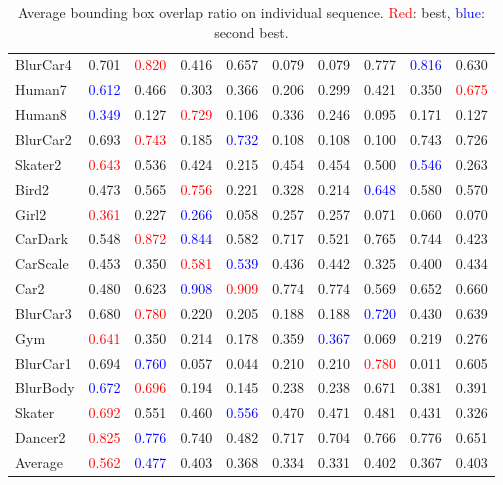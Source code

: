 \documentclass[10pt,twocolumn,letterpaper]{article}
\begin{document}
\begin{table*}
\begin{center}
\begin{tabular}{|p{1.7cm}|K{1.1cm}|K{1.1cm}|K{1.1cm}|K{1.1cm}|K{1.1cm}|K{1.1cm}|K{1.1cm}|K{1.1cm}|K{1.1cm}|}
BlurCar4 & 0.701 & \textcolor{red}{0.820}   & 0.416 & 0.657 & 0.079 & 0.079 & 0.777 & \textcolor{blue}{0.816} & 0.630  \\
Human7   & \textcolor{blue}{0.612} & 0.466  & 0.303 & 0.366 & 0.206 & 0.299 & 0.421 & 0.350  & \textcolor{red}{0.675} \\
Human8   & \textcolor{blue}{0.349} & 0.127  & \textcolor{red}{0.729} & 0.106 & 0.336 & 0.246 & 0.095 & 0.171 & 0.127 \\
BlurCar2 & 0.693 & \textcolor{red}{0.743}  & 0.185 & \textcolor{blue}{0.732} & 0.108 & 0.108 & 0.100   & 0.743 & 0.726 \\
Skater2  & \textcolor{red}{0.643} & 0.536  & 0.424 & 0.215 & 0.454 & 0.454 & 0.500   & \textcolor{blue}{0.546} & 0.263 \\
Bird2    & 0.473 & 0.565  & \textcolor{red}{0.756} & 0.221 & 0.328 & 0.214 & \textcolor{blue}{0.648} & 0.580  & 0.570  \\
Girl2    & \textcolor{red}{0.361} & 0.227  & \textcolor{blue}{0.266} & 0.058 & 0.257 & 0.257 & 0.071 & 0.060  & 0.070  \\
CarDark  & 0.548 & \textcolor{red}{0.872}  & \textcolor{blue}{0.844} & 0.582 & 0.717 & 0.521 & 0.765 & 0.744 & 0.423 \\
CarScale & 0.453 & 0.350   & \textcolor{red}{0.581} & \textcolor{blue}{0.539} & 0.436 & 0.442 & 0.325 & 0.400   & 0.434 \\
Car2     & 0.480  & 0.623  & \textcolor{blue}{0.908} & \textcolor{red}{0.909} & 0.774 & 0.774 & 0.569 & 0.652 & 0.660  \\
BlurCar3 & 0.680  & \textcolor{red}{0.780}   & 0.220  & 0.205 & 0.188 & 0.188 & \textcolor{blue}{0.720}  & 0.430  & 0.639 \\
Gym      & \textcolor{red}{0.641} & 0.350   & 0.214 & 0.178 & 0.359 & \textcolor{blue}{0.367} & 0.069 & 0.219 & 0.276 \\
BlurCar1 & 0.694 & \textcolor{blue}{0.760}   & 0.057 & 0.044 & 0.210  & 0.210  & \textcolor{red}{0.780}  & 0.011 & 0.605 \\
BlurBody & \textcolor{blue}{0.672} & \textcolor{red}{0.696}  & 0.194 & 0.145 & 0.238 & 0.238 & 0.671 & 0.381 & 0.391 \\
Skater   & \textcolor{red}{0.692} & 0.551  & 0.460  & \textcolor{blue}{0.556} & 0.470  & 0.471 & 0.481 & 0.431 & 0.326 \\
Dancer2  & \textcolor{red}{0.825} & \textcolor{blue}{0.776}  & 0.740  & 0.482 & 0.717 & 0.704 & 0.766 & 0.776 & 0.651 \\
\hline\hline
Average  & \textcolor{red}{0.562} & \textcolor{blue}{0.477}  & 0.403  & 0.368 & 0.334 & 0.331 & 0.402 & 0.367 & 0.403 \\
\hline
\end{tabular}
\end{center}
\caption{Average bounding box overlap ratio on individual sequence. \textcolor{red}{Red}: best, \textcolor{blue}{blue}: second best.}
\label{tb:seq_comp_table}
\end{table*}
\end{document}
